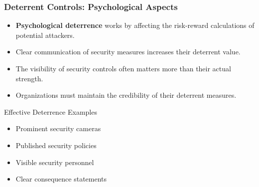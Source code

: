 \documentclass{beamer}
\begin{document}
\begin{frame}
    \frametitle{Deterrent Controls: Psychological Aspects}
    
    \begin{itemize}
        \item \textbf{Psychological deterrence} works by affecting the risk-reward calculations of potential attackers.
        
        \item Clear communication of security measures increases their deterrent value.
        
        \item The visibility of security controls often matters more than their actual strength.
        
        \item Organizations must maintain the credibility of their deterrent measures.
    \end{itemize}
    
    \begin{exampleblock}{Effective Deterrence Examples}
        \begin{itemize}
            \item Prominent security cameras
            \item Published security policies
            \item Visible security personnel
            \item Clear consequence statements
        \end{itemize}
    \end{exampleblock}
\end{frame}
\end{document}
